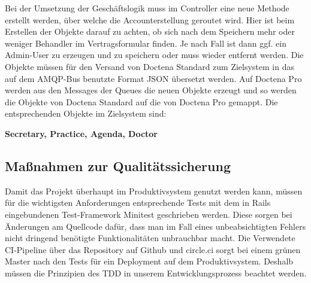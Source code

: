 Bei der Umsetzung der Geschäftslogik muss im Controller eine neue Methode erstellt werden, über welche die Accounterstellung geroutet wird. Hier ist beim Erstellen der Objekte darauf zu achten, ob sich nach dem Speichern mehr oder weniger Behandler im Vertragsformular finden. Je nach Fall ist dann ggf. ein Admin-User zu erzeugen und zu speichern oder muss wieder entfernt werden. Die Objekte müssen für den Versand von Doctena Standard zum Zielsystem in das auf dem \ac{AMQP}-Bus benutzte Format \ac{JSON} übersetzt werden. Auf Doctena Pro werden aus den Messages der Queues die neuen Objekte erzeugt und so werden die Objekte von Doctena Standard auf die von Doctena Pro gemappt. Die entsprechenden Objekte im Zielsystem sind:

\textbf{Secretary, Practice, Agenda, Doctor}

\subsection{Maßnahmen zur Qualitätssicherung}
\label{sec:Qualitaetssicherung}

Damit das Projekt überhaupt im Produktivsystem genutzt werden kann, müssen für die wichtigsten Anforderungen entsprechende Tests mit dem in Rails eingebundenen Test-Framework Minitest geschrieben werden. Diese sorgen bei Änderungen am Quellcode dafür, dass man im Fall eines unbeabsichtigten Fehlers nicht dringend benötigte Funktionalitäten unbrauchbar macht. Die Verwendete \ac{CI}-Pipeline über das Repository auf Github und circle.ci sorgt bei einem grünen Master nach den Tests für ein Deployment auf dem Produktivsystem. Deshalb müssen die Prinzipien des \ac{TDD} in unserem Entwicklungsprozess beachtet werden.

